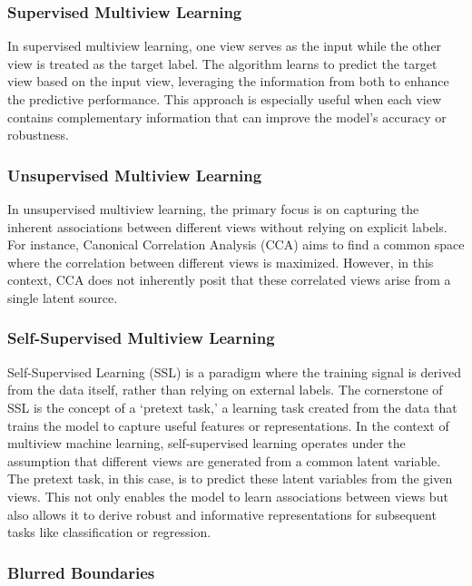 \subsubsection{Supervised Multiview Learning}

In supervised multiview learning, one view serves as the input while the other view is treated as the target label. The algorithm learns to predict the target view based on the input view, leveraging the information from both to enhance the predictive performance. This approach is especially useful when each view contains complementary information that can improve the model's accuracy or robustness.

\subsubsection{Unsupervised Multiview Learning}

In unsupervised multiview learning, the primary focus is on capturing the inherent associations between different views without relying on explicit labels. For instance, Canonical Correlation Analysis (CCA) aims to find a common space where the correlation between different views is maximized. However, in this context, CCA does not inherently posit that these correlated views arise from a single latent source.

\subsubsection{Self-Supervised Multiview Learning}

Self-Supervised Learning (SSL) is a paradigm where the training signal is derived from the data itself, rather than relying on external labels. The cornerstone of SSL is the concept of a `pretext task,' a learning task created from the data that trains the model to capture useful features or representations. In the context of multiview machine learning, self-supervised learning operates under the assumption that different views are generated from a common latent variable. The pretext task, in this case, is to predict these latent variables from the given views. This not only enables the model to learn associations between views but also allows it to derive robust and informative representations for subsequent tasks like classification or regression.

\subsubsection{Blurred Boundaries}

